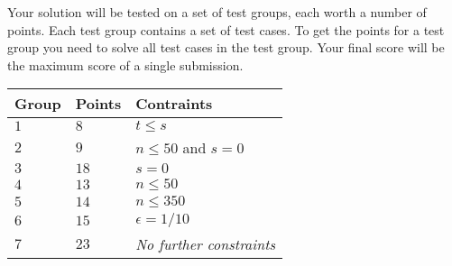 Your solution will be tested on a set of test groups, each worth a number of points.
Each test group contains a set of test cases.
To get the points for a test group you need to solve all test cases in the test group.
Your final score will be the maximum score of a single submission.

\medskip
\noindent
\begin{tabular}{lll}
  Group & Points & Contraints\\\hline
  $1$ & $8$ &  $t\leq s$\\
  $2$ & $9$ & $n\le 50$ and $s=0$\\
  $3$ & $18$ & $s=0$\\
  $4$ & $13$ & $n\leq 50$\\
  $5$ & $14$ & $n\leq 350$\\
  $6$ & $15$ & $\epsilon = 1/10$\\
  $7$ & $23$ & \emph{No further constraints}\\
\end{tabular}
